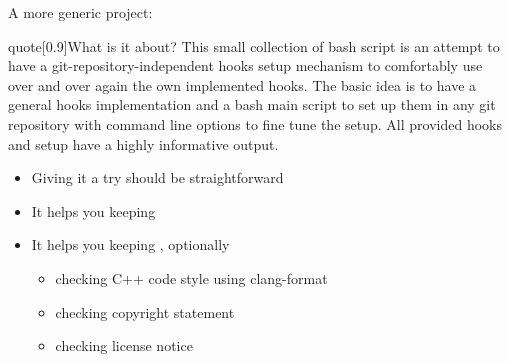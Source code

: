 \begin{frame}{A more generic project: }
    \begin{varblock}{quote}[0.9\textwidth]{What is it about?}
        This small collection of bash script is an attempt to have a git-repository-independent hooks setup mechanism to comfortably use over and over again the own implemented hooks.
        The basic idea is to have a general hooks implementation and a bash main script to set up them in any git repository with command line options to fine tune the setup.
        All provided hooks and setup have a highly informative output.
    \end{varblock}
    \vspace{2mm}
    \begin{itemize}
        \item Giving it a try should be straightforward
        \item It helps you keeping  
        \item It helps you keeping , optionally 
              \begin{itemize}
                  \item checking C++ code style using clang-format
                  \item checking copyright statement
                  \item checking license notice
              \end{itemize}
    \end{itemize}
\end{frame}
\begingroup
\newcommand{\LoggerMsg}[3]{\tc{#1}{\texttt{\parbox[b]{16mm}{\hfill#2} #3}}}
